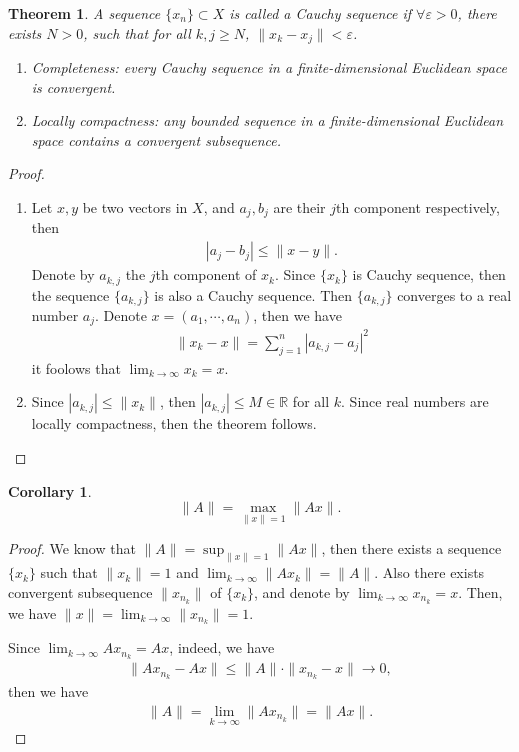 \documentclass[11pt]{book}
\newtheorem{theorem}{Theorem}[section]
\newtheorem{corollary}{Corollary}[theorem]
\theoremstyle{definition}
\numberwithin{equation}{chapter}
\begin{document}
\begin{theorem}\label{cauchy_sequence_eclidean_theorem}
A sequence $\{x_n\}\subset X$ is called a Cauchy sequence if $\forall \varepsilon > 0$, there exists $N > 0$,  such that for all $k, j \geq N$, $\|x_k - x_j\| < \varepsilon$. 
\begin{enumerate}[label=(\alph*)]
    \item Completeness: every Cauchy sequence in a finite-dimensional Euclidean space is convergent.
    \item Locally compactness: any bounded sequence in a finite-dimensional Euclidean space contains a convergent subsequence. 
\end{enumerate}
\end{theorem}
\begin{proof}
~\begin{enumerate}[label=(\alph*)]
    \item Let $x,y$ be two vectors in $X$, and $a_j, b_j$ are their $j$th component respectively, then 
    \begin{align*}
        |a_j - b_j| \leq \|x - y\|.
    \end{align*}
    Denote by $a_{k,j}$ the $j$th component of $x_k$. Since $\{x_k\}$ is Cauchy sequence, then the sequence $\{a_{k,j}\}$ is also a Cauchy sequence. Then $\{a_{k,j}\}$ converges to a real number $a_j$. Denote $x = (a_1, \cdots, a_n)$, then we have 
    \begin{align*}
        \|x_k - x\| = \sum^n_{j=1} |a_{k,j} - a_j|^2
    \end{align*}
    it foolows that $\lim_{k\to\infty} x_k = x$.
    \item Since $|a_{k,j}| \leq \|x_k\|$, then $|a_{k,j}| \leq M \in\mathbb{R}$ for all $k$. Since real numbers are locally compactness, then the theorem follows.
\end{enumerate}

\end{proof}

\medskip

\begin{corollary}
$$\|A\| = \max_{\|x\| = 1} \|Ax\|.$$
\end{corollary}
\begin{proof}
We know that $\|A\| = \sup_{\|x\| = 1} \|Ax\|$, then there exists a sequence $\{x_k\}$ such that $\|x_k\| = 1$ and $\lim_{k\to\infty} \|Ax_k\| = \|A\|$. Also there exists convergent subsequence $\|x_{n_k}\|$ of $\{x_k\}$, and denote by $\lim_{k\to\infty} x_{n_k} = x$. Then, we have $\|x\| = \lim_{k\to\infty} \|x_{n_k}\| = 1$. 

Since $\lim_{k\to\infty} Ax_{n_k} = Ax$, indeed, we have
\begin{align*}
    \|Ax_{n_k} - Ax\| \leq \|A\| \cdot \|x_{n_k} - x\| \to 0,
\end{align*}
then we have 
\begin{align*}
    \|A\| = \lim_{k\to\infty} \|Ax_{n_k}\| = \|Ax\|.
\end{align*}
\end{proof}
\end{document}
